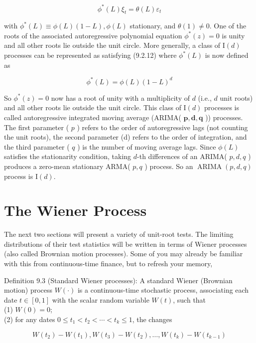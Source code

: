 \documentclass[10pt]{article}
\begin{document}
\begin{equation*}
\phi^{*}(L) \xi_{t}=\theta(L) \varepsilon_{t} \tag{9.2.12}
\end{equation*}


with $\phi^{*}(L) \equiv \phi(L)(1-L), \phi(L)$ stationary, and $\theta(1) \neq 0$. One of the roots of the associated autoregressive polynomial equation $\phi^{*}(z)=0$ is unity and all other roots lie outside the unit circle. More generally, a class of $\mathrm{I}(d)$ processes can be represented as satisfying (9.2.12) where $\phi^{*}(L)$ is now defined as


\begin{equation*}
\phi^{*}(L)=\phi(L)(1-L)^{d} \tag{9.2.13}
\end{equation*}


So $\phi^{*}(z)=0$ now has a root of unity with a multiplicity of $d$ (i.e., $d$ unit roots) and all other roots lie outside the unit circle. This class of $\mathrm{I}(d)$ processes is called autoregressive integrated moving average (ARIMA( $\boldsymbol{p}, \boldsymbol{d}, \boldsymbol{q}$ )) processes. The first parameter ( $p$ ) refers to the order of autoregressive lags (not counting the unit roots), the second parameter (d) refers to the order of integration, and the third parameter ( $q$ ) is the number of moving average lags. Since $\phi(L)$ satisfies the stationarity condition, taking $d$-th differences of an ARIMA( $p, d, q$ ) produces a zero-mean stationary ARMA( $p, q$ ) process. So an $\operatorname{ARIMA}(p, d, q)$ process is $\mathrm{I}(d)$.

\section*{The Wiener Process}
The next two sections will present a variety of unit-root tests. The limiting distributions of their test statistics will be written in terms of Wiener processes (also called Brownian motion processes). Some of you may already be familiar with this from continuous-time finance, but to refresh your memory,

Definition 9.3 (Standard Wiener processes): A standard Wiener (Brownian motion) process $W(\cdot)$ is a continuous-time stochastic process, associating each date $t \in[0,1]$ with the scalar random variable $W(t)$, such that\\
(1) $W(0)=0$;\\
(2) for any dates $0 \leq t_{1}<t_{2}<\cdots<t_{k} \leq 1$, the changes

$$
W\left(t_{2}\right)-W\left(t_{1}\right), W\left(t_{3}\right)-W\left(t_{2}\right), \ldots, W\left(t_{k}\right)-W\left(t_{k-1}\right)
$$
\end{document}
